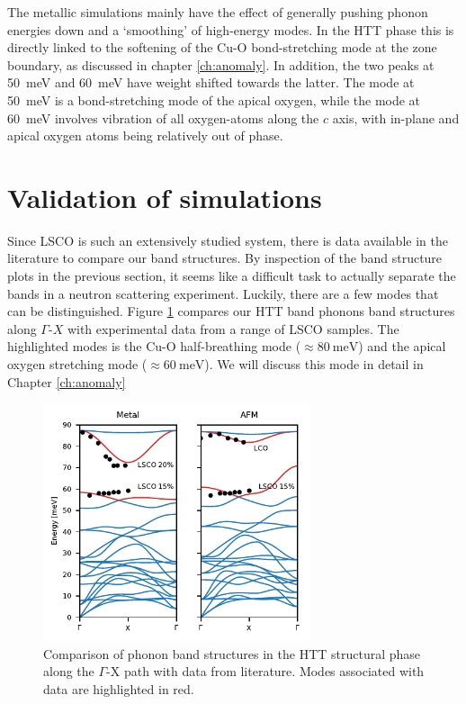 The metallic simulations mainly have the effect of generally pushing phonon energies down and a `smoothing' of high-energy modes. In the HTT phase this is directly linked to the softening of the Cu-O bond-stretching mode at the zone boundary, as discussed in chapter \ref{ch:anomaly}. In addition, the two peaks at \SI{50}{\milli\eV} and \SI{60}{\milli\eV} have weight shifted towards the latter. The mode at \SI{50}{\milli\eV} is a bond-stretching mode of the apical oxygen, while the mode at \SI{60}{\milli\eV} involves vibration of all oxygen-atoms along the $c$ axis, with in-plane and apical oxygen atoms being relatively out of phase.

\section{Validation of simulations}\label{sec:sim_validation}
Since LSCO is such an extensively studied system, there is data available in the literature to compare our band structures. By inspection of the band structure plots in the previous section, it seems like a difficult task to actually separate the bands in a neutron scattering experiment. Luckily, there are a few modes that can be distinguished. Figure \ref{fig:htt_phonons_lit} compares our HTT band phonons band structures along $\Gamma$-$X$ with experimental data from a range of LSCO samples. The highlighted modes is the Cu-O half-breathing mode ($\approx \SI{80}{\milli\eV}$) and the apical oxygen stretching mode ($\approx \SI{60}{\milli\eV}$). We will discuss this mode in detail in Chapter \ref{ch:anomaly}

\begin{figure}
	\centering
	\includegraphics[width=0.7\textwidth]{fig/simulation/htt_phonons_lit.pdf}
	\caption[phonon bands: comparison with literature]{Comparison of phonon band structures in the HTT structural phase along the $\Gamma$-X path with data from literature. Modes associated with data are highlighted in red.}
	\label{fig:htt_phonons_lit}
\end{figure}


